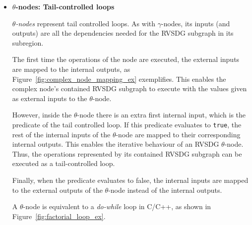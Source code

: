 \begin{itemize}
\item \textbf{$\theta$-nodes: Tail-controlled loops}

\textit{$\theta$-nodes} represent tail controlled loops. As with
$\gamma$-nodes, its inputs (and outputs) are all the dependencies needed for the
RVSDG subgraph in its subregion.

The first time the operations of the node are executed, the external inputs are
mapped to the internal outputs, as Figure~\ref{fig:complex_node_mapping_ex}
exemplifies. This enables the complex node's contained RVSDG subgraph to
execute with the values given as external inputs to the $\theta$-node.

However, inside the $\theta$-node there is an extra first internal input, which
is the predicate of the tail controlled loop. If this predicate evaluates to
\lstinline!true!, the rest of the internal inputs of the $\theta$-node are
mapped to their corresponding internal outputs. This enables the iterative
behaviour of an RVSDG $\theta$-node. Thus, the operations represented by its
contained RVSDG subgraph can be executed as a tail-controlled loop.

Finally, when the predicate evaluates to false, the internal inputs are mapped
to the external outputs of the $\theta$-node instead of the internal outputs.

A $\theta$-node is equivalent to a \textit{do-while} loop in C/C++, as shown in
Figure~\ref{fig:factorial_loop_ex}.


\end{itemize}
